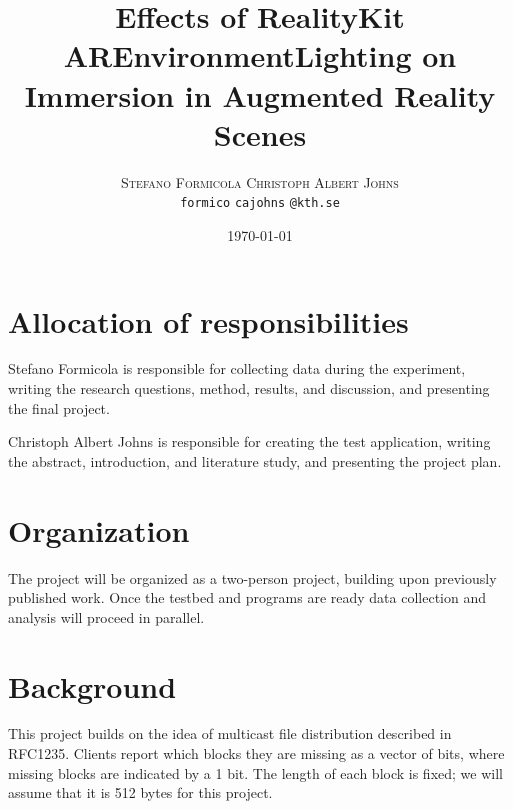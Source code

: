 \documentclass[12pt,twoside,english]{article}
\title{Effects of RealityKit AREnvironmentLighting on Immersion in Augmented Reality Scenes}
\author{
        \textsc{Stefano Formicola}
            \qquad
        \textsc{Christoph Albert Johns}
        \mbox{}\\
        \normalsize
            \texttt{formico}
        \textbar{}
            \texttt{cajohns}
        \normalsize
            \texttt{@kth.se}
}
\date{\today}
\begin{document}
\maketitle






\section{Allocation of responsibilities}
\label{sect:alloc_responsibilities}

Stefano Formicola is responsible for collecting data during the experiment, writing the research questions, method, results, and discussion, and presenting the final project.

Christoph Albert Johns is responsible for creating the test application, writing the abstract, introduction, and literature study, and presenting the project plan.


\section{Organization}
\label{sect:organization}

The project will be organized as a two-person project, building upon previously published work. Once the testbed and programs are ready data collection and analysis will proceed in parallel.


\section{Background}
\label{sect:background}
This project builds on the idea of multicast file distribution described in RFC1235\cite{john_ioannidis_coherent_1991}. Clients report which blocks they are missing as a vector of bits, where missing blocks are indicated by a 1 bit. The length of each block is fixed; we will assume that it is 512 bytes for this project.
\end{document}
